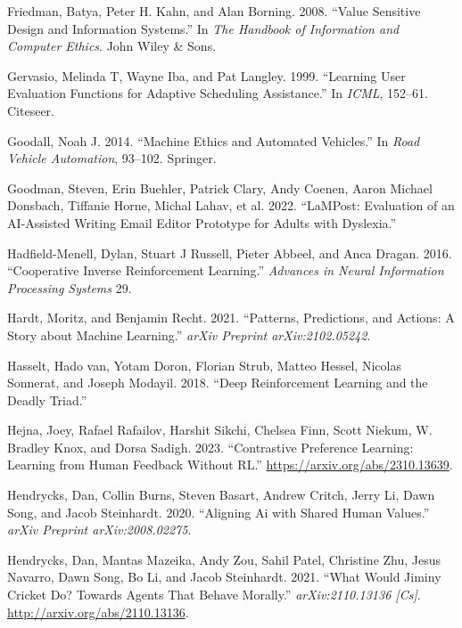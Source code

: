 \documentclass[
  letterpaper,
  numbers=noenddot,
  DIV=11]{scrreprt}
\newlength{\cslhangindent}
\newenvironment{CSLReferences}[2] %
 {\begin{list}{}{%
  \setlength{\itemindent}{0pt}
  \setlength{\leftmargin}{0pt}
  \setlength{\parsep}{0pt}
  \ifodd #1
   \setlength{\leftmargin}{\cslhangindent}
   \setlength{\itemindent}{-1\cslhangindent}
  \fi
  \setlength{\itemsep}{#2\baselineskip}}}
 {\end{list}}
\theoremstyle{definition}
\theoremstyle{plain}
\theoremstyle{plain}
\theoremstyle{remark}
\begin{document}
\begin{CSLReferences}{1}{0}
Friedman, Batya, Peter H. Kahn, and Alan Borning. 2008. {``Value
Sensitive Design and Information Systems.''} In \emph{The Handbook of
Information and Computer Ethics}. John Wiley \& Sons.

Gervasio, Melinda T, Wayne Iba, and Pat Langley. 1999. {``Learning User
Evaluation Functions for Adaptive Scheduling Assistance.''} In
\emph{ICML}, 152--61. Citeseer.

Goodall, Noah J. 2014. {``Machine Ethics and Automated Vehicles.''} In
\emph{Road Vehicle Automation}, 93--102. Springer.

Goodman, Steven, Erin Buehler, Patrick Clary, Andy Coenen, Aaron Michael
Donsbach, Tiffanie Horne, Michal Lahav, et al. 2022. {``LaMPost:
Evaluation of an AI-Assisted Writing Email Editor Prototype for Adults
with Dyslexia.''}

Hadfield-Menell, Dylan, Stuart J Russell, Pieter Abbeel, and Anca
Dragan. 2016. {``Cooperative Inverse Reinforcement Learning.''}
\emph{Advances in Neural Information Processing Systems} 29.

Hardt, Moritz, and Benjamin Recht. 2021. {``Patterns, Predictions, and
Actions: A Story about Machine Learning.''} \emph{arXiv Preprint
arXiv:2102.05242}.

Hasselt, Hado van, Yotam Doron, Florian Strub, Matteo Hessel, Nicolas
Sonnerat, and Joseph Modayil. 2018. {``Deep Reinforcement Learning and
the Deadly Triad.''}

Hejna, Joey, Rafael Rafailov, Harshit Sikchi, Chelsea Finn, Scott
Niekum, W. Bradley Knox, and Dorsa Sadigh. 2023. {``Contrastive
Preference Learning: Learning from Human Feedback Without RL.''}
\url{https://arxiv.org/abs/2310.13639}.

Hendrycks, Dan, Collin Burns, Steven Basart, Andrew Critch, Jerry Li,
Dawn Song, and Jacob Steinhardt. 2020. {``Aligning Ai with Shared Human
Values.''} \emph{arXiv Preprint arXiv:2008.02275}.

Hendrycks, Dan, Mantas Mazeika, Andy Zou, Sahil Patel, Christine Zhu,
Jesus Navarro, Dawn Song, Bo Li, and Jacob Steinhardt. 2021. {``What
{Would} {Jiminy} {Cricket} {Do}? {Towards} {Agents} {That} {Behave}
{Morally}.''} \emph{arXiv:2110.13136 {[}Cs{]}}.
\url{http://arxiv.org/abs/2110.13136}.


\end{CSLReferences}
\end{document}
